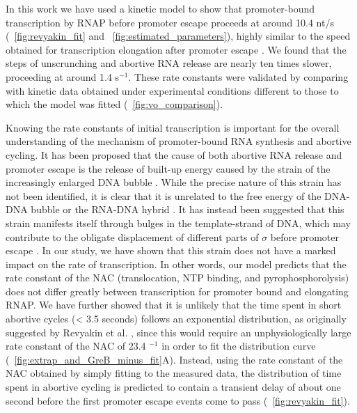 %
In this work we have used a kinetic model to show that promoter-bound
transcription by RNAP before promoter escape proceeds at around 10.4 nt/s
(\FIGS~\ref{fig:revyakin_fit} and \FIG~\ref{fig:estimated_parameters}), highly
similar to the speed obtained for transcription elongation after promoter
escape \cite{revyakin_abortive_2006}. We found that the steps of unscrunching
and abortive RNA release are nearly ten times slower, proceeding at around 1.4
s$^{-1}$. These rate constants were validated by comparing with kinetic data
obtained under experimental conditions different to those to which the model
was fitted (\FIG~\ref{fig:vo_comparison}).

Knowing the rate constants of initial transcription is important for the overall
understanding of the mechanism of promoter-bound RNA synthesis and abortive
cycling. It has been proposed that the cause of both abortive RNA release and
promoter escape is the release of built-up energy caused by the strain of the
increasingly enlarged DNA bubble \cite{straney_stressed_1987,
hsu_promoter_2002, revyakin_abortive_2006}. While the precise nature of this
strain has not been identified, it is clear that it is unrelated to the free
energy of the DNA-DNA bubble or the RNA-DNA hybrid \cite{hsu_initial_2006,
skancke_sequence-dependent_2015}. It has instead been suggested that this
strain manifests itself through bulges in the template-strand of DNA, which
may contribute to the obligate displacement of different parts of $\sigma$
before promoter escape \cite{winkelman_crosslink_2015}. In our study, we have
shown that this strain does not have a marked impact on the rate of
transcription. In other words, our model predicts that the rate constant of
the NAC (translocation, NTP binding, and pyrophosphorolysis) does not differ
greatly between transcription for promoter bound and elongating RNAP. We have
further showed that it is unlikely that the time spent in short abortive
cycles (< 3.5 seconds) follows an exponential distribution, as originally
suggested by Revyakin et al. \cite{revyakin_abortive_2006}, since this would
require an unphysiologically large rate constant of the NAC of 23.4 $^{-1}$ in
order to fit the distribution curve
(\FIG~\ref{fig:extrap_and_GreB_minus_fit}A). Instead, using the rate constant
of the NAC obtained by simply fitting to the measured data, the distribution
of time spent in abortive cycling is predicted to contain a transient delay of
about one second before the first promoter escape events come to pass
(\FIG~\ref{fig:revyakin_fit}).

